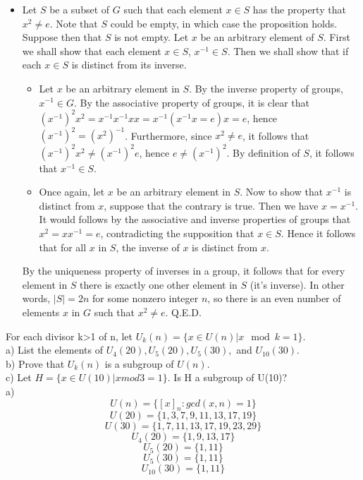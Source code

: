 \documentclass{article}
\begin{document}
\begin{itemize}
    
    \item Let $S$ be a subset of $G$ such that each element $x\in S$ has the property that $x^2 \ne e$. Note that $S$ could be empty, in which case the proposition holds. Suppose then that $S$ is not empty. Let $x$ be an arbitrary element of $S$. First we shall show that each element $x\in S$, $x^{-1}\in S$. Then we shall show that if each $x\in S$ is distinct from its inverse.
    \begin{itemize}
        \item Let $x$ be an arbitrary element in $S$. By the inverse property of groups, $x^{-1} \in G$. By the associative property of groups, it is clear that $(x^{-1})^2x^2 = x^{-1}x^{-1}xx = x^{-1}(x^{-1}x = e)x = e$, hence $(x^{-1})^2 = (x^2)^{-1}$. Furthermore, since $x^2 \ne e$, it follows that $(x^{-1})^2x^2 \ne (x^{-1})^2 e$, hence $e\ne (x^{-1})^2$. By definition of $S$, it follows that $x^{-1}\in S$.
        \item  Once again, let $x$ be an arbitrary element in $S$. Now to show that $x^{-1}$ is distinct from $x$, suppose that the contrary is true. Then we have $x = x^{-1}$. It would follows by the associative and inverse properties of groups that $x^2 = xx^{-1} = e$, contradicting the supposition that $x\in S$. Hence it follows that for all $x$ in $S$, the inverse of $x$ is distinct from $x$.
    \end{itemize} By the uniqueness property of inverses in a group, it follows that for every element in $S$ there is exactly one other element in $S$ (it's inverse). In other words, $|S| = 2n$ for some nonzero integer $n$, so there is an even number of elements $x$ in $G$ such that $x^2 \ne e$. Q.E.D.
\end{itemize}
\newpage

 For each divisor k>1 of n, let $U_k(n)=\{ x\in U(n)|x \mod k=1\}$.\\
a) List the elements of $U_4(20), U_5(20), U_5(30),$ and $U_{10}(30)$.\\
b) Prove that $U_k(n)$ is a subgroup of $U(n)$.\\ 
c) Let $H=\{x\in U(10)|x mod 3=1\}$. Is H a subgroup of U(10)?\\

a)
$$U(n)=\{[x]_n : gcd(x, n)=1\}$$
$$U(20)=\{1, 3, 7, 9, 11, 13, 17, 19\}$$
$$U(30)=\{1, 7, 11, 13, 17, 19, 23, 29\}$$
$$U_4(20)=\{1, 9, 13, 17\}$$
$$U_5(20)=\{1, 11\}$$
$$U_5(30)=\{1, 11\}$$
$$U_{10}(30)=\{1, 11\}$$
\\
\end{document}
